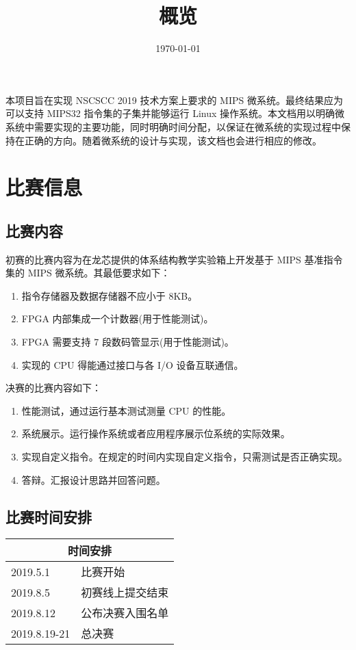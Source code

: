 \documentclass[blue,normal,cn]{elegantnote}
\title{概览}
\date{\today}
\begin{document}
	
\maketitle

本项目旨在实现 NSCSCC 2019 技术方案上要求的 MIPS 微系统。最终结果应为可以支持 MIPS32 指令集的子集并能够运行 Linux 操作系统。本文档用以明确微系统中需要实现的主要功能，同时明确时间分配，以保证在微系统的实现过程中保持在正确的方向。随着微系统的设计与实现，该文档也会进行相应的修改。
\section{比赛信息}
\subsection{比赛内容}
初赛的比赛内容为在龙芯提供的体系结构教学实验箱上开发基于 MIPS 基准指令集的 MIPS 微系统。其最低要求如下：
\begin{enumerate}[1)]
	\item 指令存储器及数据存储器不应小于 8KB。
	\item FPGA 内部集成一个计数器(用于性能测试)。
	\item FPGA 需要支持 7 段数码管显示(用于性能测试)。
	\item 实现的 CPU 得能通过接口与各 I/O 设备互联通信。
\end{enumerate}
决赛的比赛内容如下：
\begin{enumerate}[1)]
	\item 性能测试，通过运行基本测试测量 CPU 的性能。
	\item 系统展示。运行操作系统或者应用程序展示位系统的实际效果。
	\item 实现自定义指令。在规定的时间内实现自定义指令，只需测试是否正确实现。
	\item 答辩。汇报设计思路并回答问题。
\end{enumerate}

\subsection{比赛时间安排}
\begin{table}[!htbp]
	\centering
	\begin{tabular}{ll}
		\hline
		\multicolumn{2}{c}{时间安排} \\ \hline
		2019.5.1       & 比赛开始      \\
		2019.8.5       & 初赛线上提交结束  \\
		2019.8.12      & 公布决赛入围名单  \\
		2019.8.19-21   & 总决赛       \\ \hline
	\end{tabular}
\end{table}
\end{document}
